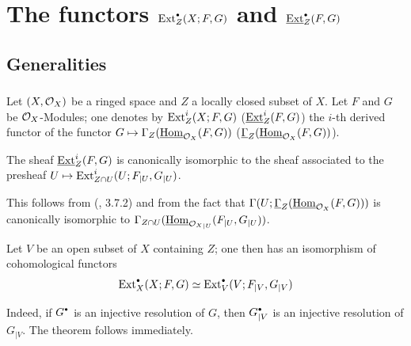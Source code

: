 \chapter{The functors $\protect\Ext^{\protect\boule}_Z(X;F, G)$ and $\protect\SheafExt^{\protect\boule}_Z(F, G)$} \label{VI}


\section{Generalities} \label{VI.1}
%
\subsection{} \label{VI.1.1}
Let $(X, \mathcal{O}_X)$ be a ringed space and $Z$ a locally closed subset of $X$. Let $F$ and $G$ be $\mathcal{O}_X$-Modules; one denotes by ${\operatorname{Ext}_Z^i}(X;F, G)$ (\resp ${\operatorname{\underline{Ext}}_Z^i}(F, G)$) the $i$-th derived functor of the functor $G \mto \Gamma_Z(\SheafHom_{\OX}(F, G))$ (\resp $\underline{\Gamma}_Z(\operatorname{\underline{Hom}}_{\mathcal{O}_X}(F, G))$).

\begin{lemma} \label{VI.1.2}
The sheaf ${\operatorname{\underline{Ext}}_Z^i}(F, G)$ is canonically isomorphic to the sheaf associated to the presheaf $U\mto {\Ext_{Z\cap U}^i}(U;F_{|U}, G_{|U})$.
\end{lemma}

This follows from (\cite{Tohoku}, 3.7.2) and from the fact that $\Gamma(U;\underline{\Gamma}_Z(\operatorname{\underline{Hom}}_{\mathcal{O}_X}(F, G)))$ is canonically isomorphic to $\Gamma_{Z\cap U}(\operatorname{\underline{Hom}}_{{\mathcal{O}_X}_{|U}}(F_{|U}, G_{|U}))$.

\begin{theorem} \label{VI.1.3}
Let $V$ be an open subset of $X$ containing $Z$; one then has an isomorphism of cohomological functors
\begin{equation} \label{VI.1.3.1}
\Ext_{X}^{\boule}(X;F, G) \simeq \Ext_{V}^{\boule}(V;F_{|V}, G_{|V})
\end{equation}
\end{theorem}

Indeed, if $G^\boule$ is an injective resolution of $G$, then $G^\boule_{|V}$ is an injective resolution of $G_{|V}$. The theorem follows immediately.


